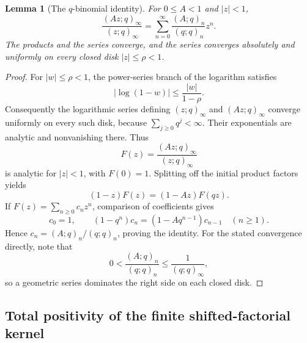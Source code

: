 \documentclass[11pt,a4paper]{article}
\newtheorem{lemma}[theorem]{Lemma}
\theoremstyle{definition}
\theoremstyle{remark}
\begin{document}
\begin{lemma}[The \(q\)-binomial identity]\label{qg:binomial}
For \(0\le A<1\) and \(|z|<1\),
\begin{equation}\label{qg:binomial-equation}
 \frac{(Az;q)_\infty}{(z;q)_\infty}
 =\sum_{n=0}^{\infty}\frac{(A;q)_n}{(q;q)_n}z^n.
\end{equation}
The products and the series converge, and the series converges
absolutely and uniformly on every closed disk \(|z|\le\rho<1\).
\end{lemma}
\begin{proof}
For \(|w|\le\rho<1\), the power-series branch of the logarithm
satisfies
\[
 |\log(1-w)|\le \frac{|w|}{1-\rho}.
\]
Consequently the logarithmic series defining \((z;q)_\infty\)
and \((Az;q)_\infty\) converge uniformly on every such disk,
because \(\sum_{j\ge0}q^j<\infty\). Their exponentials are analytic
and nonvanishing there. Thus
\[
 F(z)=\frac{(Az;q)_\infty}{(z;q)_\infty}
\]
is analytic for \(|z|<1\), with \(F(0)=1\). Splitting off the
initial product factors yields
\[
 (1-z)F(z)=(1-Az)F(qz).
\]
If \(F(z)=\sum_{n\ge0}c_nz^n\), comparison of coefficients gives
\[
 c_0=1,\qquad
 (1-q^n)c_n=(1-Aq^{n-1})c_{n-1}\quad(n\ge1).
\]
Hence \(c_n=(A;q)_n/(q;q)_n\), proving the identity.
For the stated convergence directly, note that
\[
 0<\frac{(A;q)_n}{(q;q)_n}
 \le\frac{1}{(q;q)_\infty},
\]
so a geometric series dominates the right side on each closed disk.
\end{proof}

\subsection{Total positivity of the finite shifted-factorial kernel}
\end{document}

